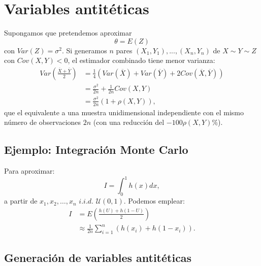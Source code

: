 \documentclass[
]{book}
\theoremstyle{break}
\theoremstyle{definition}
\theoremstyle{definition}
\theoremstyle{definition}
\theoremstyle{remark}
\begin{document}
\hypertarget{variables-antituxe9ticas}{%
\section{Variables antitéticas}\label{variables-antituxe9ticas}}

Supongamos que pretendemos aproximar
\[\theta=E\left(  Z\right)\]
con \(Var\left( Z \right) = \sigma^{2}\).
Si generamos \(n\) pares
\(\left( X_{1},Y_{1}\right), ... ,\left( X_{n},Y_{n}\right)\)
de \(X\sim Y\sim Z\) con \(Cov\left( X,Y\right) < 0\),
el estimador combinado tiene menor varianza:
\[\begin{aligned}
    Var\left(  \frac{\overline{X}+\overline{Y}}{2}\right)   & =\frac{1}{4}\left(
    Var\left(  \overline{X}\right)  +Var\left(  \overline{Y}\right)  +2Cov\left(
    \overline{X},\overline{Y}\right)  \right) \\
    & =\frac{\sigma^{2}}{2n}+\frac{1}{2n}Cov\left(  X,Y\right) \\
    & =\frac{\sigma^{2}}{2n}\left(  1+\rho \left(  X,Y\right)  \right),
\end{aligned}\]
que el equivalente a una muestra unidimensional independiente con el
mismo número de observaciones \(2n\) (con una reducción del
\(-100\rho \left( X,Y\right) \%\)).

\hypertarget{ejemplo-integraciuxf3n-monte-carlo}{%
\subsection{Ejemplo: Integración Monte Carlo}\label{ejemplo-integraciuxf3n-monte-carlo}}

Para aproximar:
\[I=\int_{0}^{1}h\left(  x\right) dx,\]
a partir de \(x_{1},x_{2},\ldots,x_{n}\) \(i.i.d.\)
\(\mathcal{U}\left(0,1\right)\).
Podemos emplear:
\[\begin{aligned}
    I  & =E\left(  \frac{h\left(  U\right)  +h\left(  1-U\right)  }{2}\right) \\
    & \approx \frac{1}{2n}\sum \limits_{i=1}^{n}\left(  h\left(  x_{i}\right)
    +h\left(  1-x_{i}\right)  \right).
\end{aligned}\]

\hypertarget{generaciuxf3n-de-variables-antituxe9ticas}{%
\subsection{Generación de variables antitéticas}\label{generaciuxf3n-de-variables-antituxe9ticas}}
\end{document}

